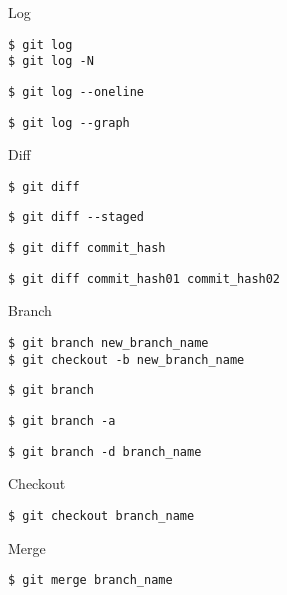\documentclass[11pt]{beamer}
\begin{document}
\begin{frame}[fragile]{Log}
    \begin{lstlisting}
$ git log
$ git log -N
    \end{lstlisting}
    \pause
    \begin{lstlisting}
$ git log --oneline
    \end{lstlisting}
    \pause
    \begin{lstlisting}
$ git log --graph
    \end{lstlisting}
\end{frame}

\begin{frame}[fragile]{Diff}
    \begin{lstlisting}
$ git diff
    \end{lstlisting}
    \pause
    \begin{lstlisting}
$ git diff --staged
    \end{lstlisting}
    \pause
    \begin{lstlisting}
$ git diff commit_hash
    \end{lstlisting}
    \pause
    \begin{lstlisting}
$ git diff commit_hash01 commit_hash02
    \end{lstlisting}
\end{frame}

\begin{frame}[fragile]{Branch}
    \begin{lstlisting}
$ git branch new_branch_name
$ git checkout -b new_branch_name
    \end{lstlisting}
    \pause
    \begin{lstlisting}
$ git branch
    \end{lstlisting}
    \pause
    \begin{lstlisting}
$ git branch -a
    \end{lstlisting}
    \pause
    \begin{lstlisting}
$ git branch -d branch_name
    \end{lstlisting}
\end{frame}

\begin{frame}[fragile]{Checkout}
    \begin{lstlisting}
$ git checkout branch_name
    \end{lstlisting}
\end{frame}

\begin{frame}[fragile]{Merge}
    \begin{lstlisting}
$ git merge branch_name
    \end{lstlisting}
\end{frame}
\end{document}
